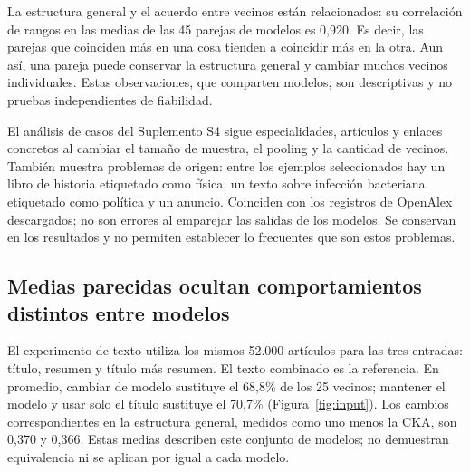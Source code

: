 \documentclass[12pt]{article}
\begin{document}
La estructura general y el acuerdo entre vecinos están relacionados: su correlación de rangos en las medias de las 45 parejas de modelos es 0,920. Es decir, las parejas que coinciden más en una cosa tienden a coincidir más en la otra. Aun así, una pareja puede conservar la estructura general y cambiar muchos vecinos individuales. Estas observaciones, que comparten modelos, son descriptivas y no pruebas independientes de fiabilidad.

El análisis de casos del Suplemento S4 sigue especialidades, artículos y enlaces concretos al cambiar el tamaño de muestra, el pooling y la cantidad de vecinos. También muestra problemas de origen: entre los ejemplos seleccionados hay un libro de historia etiquetado como física, un texto sobre infección bacteriana etiquetado como política y un anuncio. Coinciden con los registros de OpenAlex descargados; no son errores al emparejar las salidas de los modelos. Se conservan en los resultados y no permiten establecer lo frecuentes que son estos problemas.

\FloatBarrier
\subsection{Medias parecidas ocultan comportamientos distintos entre modelos}
El experimento de texto utiliza los mismos 52.000 artículos para las tres entradas: título, resumen y título más resumen. El texto combinado es la referencia. En promedio, cambiar de modelo sustituye el 68,8\% de los 25 vecinos; mantener el modelo y usar solo el título sustituye el 70,7\% (Figura~\ref{fig:input}). Los cambios correspondientes en la estructura general, medidos como uno menos la CKA, son 0,370 y 0,366. Estas medias describen este conjunto de modelos; no demuestran equivalencia ni se aplican por igual a cada modelo.
\end{document}
